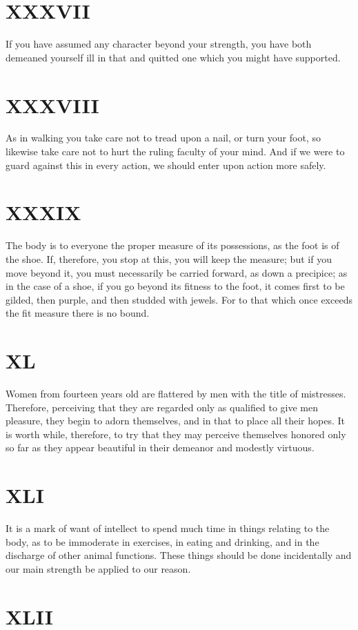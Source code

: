 \documentclass[11pt]{article}
\begin{document}
\section*{XXXVII}

If you have assumed any character beyond your strength, you have both demeaned yourself ill in that and quitted one which you might have supported.
\section*{XXXVIII}

As in walking you take care not to tread upon a nail, or turn your foot, so likewise take care not to hurt the ruling faculty of your mind. And if we were to guard against this in every action, we should enter upon action more safely.
\section*{XXXIX}

The body is to everyone the proper measure of its possessions, as the foot is of the shoe. If, therefore, you stop at this, you will keep the measure; but if you move beyond it, you must necessarily be carried forward, as down a precipice; as in the case of a shoe, if you go beyond its fitness to the foot, it comes first to be gilded, then purple, and then studded with jewels. For to that which once exceeds the fit measure there is no bound.
\section*{XL}

Women from fourteen years old are flattered by men with the title of mistresses. Therefore, perceiving that they are regarded only as qualified to give men pleasure, they begin to adorn themselves, and in that to place all their hopes. It is worth while, therefore, to try that they may perceive themselves honored only so far as they appear beautiful in their demeanor and modestly virtuous.
\section*{XLI}

It is a mark of want of intellect to spend much time in things relating to the body, as to be immoderate in exercises, in eating and drinking, and in the discharge of other animal functions. These things should be done incidentally and our main strength be applied to our reason.
\section*{XLII}
\end{document}
